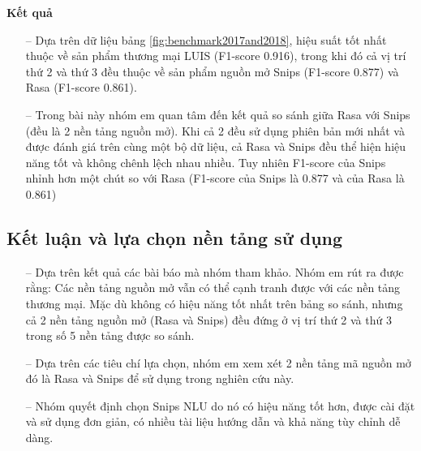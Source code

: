 \textbf{Kết quả}
\begin{itemize}
    \item[--] Dựa trên dữ liệu bảng \ref{fig:benchmark2017and2018}, hiệu suất tốt nhất thuộc về sản phẩm thương mại LUIS (F1-score 0.916), trong khi đó cả vị trí thứ 2 và thứ 3 đều thuộc về sản phẩm nguồn mở Snips (F1-score 0.877) và Rasa  (F1-score 0.861).
    \item[--] Trong bài này nhóm em quan tâm đến kết quả so sánh giữa Rasa với Snips (đều là 2 nền tảng nguồn mở). Khi cả 2 đều sử dụng phiên bản mới nhất và được đánh giá trên cùng một bộ dữ liệu, cả Rasa và Snips đều thể hiện hiệu năng tốt và không chênh lệch nhau nhiều. Tuy nhiên F1-score của Snips nhỉnh hơn một chút so với Rasa (F1-score của Snips là 0.877 và của Rasa là 0.861)
\end{itemize}

\subsection{Kết luận và lựa chọn nền tảng sử dụng}

\begin{itemize}
    \item[--] Dựa trên kết quả các bài báo mà nhóm tham khảo. Nhóm em rút ra được rằng: Các nền tảng nguồn mở vẫn có thể cạnh tranh được với các nền tảng thương mại. Mặc dù không có hiệu năng tốt nhất trên bảng so sánh, nhưng cả 2 nền tảng nguồn mở (Rasa và Snips) đều đứng ở vị trí thứ 2 và thứ 3 trong số 5 nền tảng được so sánh.
    \item[--] Dựa trên các tiêu chí lựa chọn, nhóm em xem xét 2 nền tảng mã nguồn mở đó là Rasa và Snips để sử dụng trong nghiên cứu này. 
    \item[--] Nhóm quyết định chọn Snips NLU do nó có hiệu năng tốt hơn, được cài đặt và sử dụng đơn giản, có nhiều tài liệu hướng dẫn và khả năng tùy chỉnh dễ dàng.
\end{itemize}